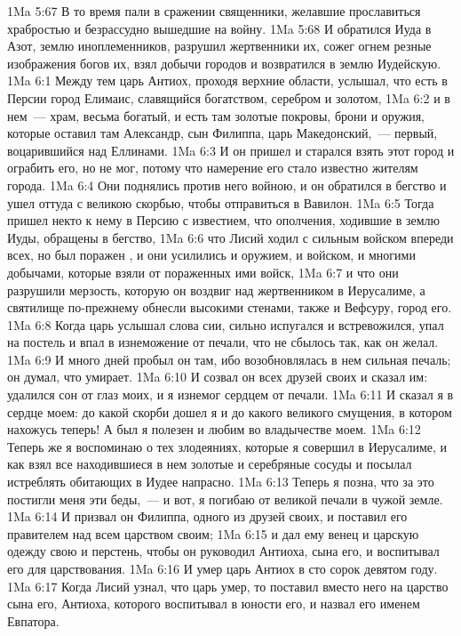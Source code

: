 \vs 1Ma 5:67 В то время пали в сражении священники, желавшие прославиться храбростью и безрассудно вышедшие на войну.
\vs 1Ma 5:68 И обратился Иуда в Азот, землю иноплеменников, разрушил жертвенники их, сожег огнем резные изображения богов их, взял добычи городов и возвратился в землю Иудейскую.
\vs 1Ma 6:1 Между тем царь Антиох, проходя верхние области, услышал, что есть в Персии город Елимаис, славящийся богатством, серебром и золотом,
\vs 1Ma 6:2 и в нем~--- храм, весьма богатый, и есть там золотые покровы, брони и оружия, которые оставил там Александр, сын Филиппа, царь Македонский,~--- первый, воцарившийся над Еллинами.
\vs 1Ma 6:3 И он пришел и старался взять этот город и ограбить его, но не мог, потому что намерение его стало известно жителям города.
\vs 1Ma 6:4 Они поднялись против него войною, и он обратился в бегство и ушел оттуда с великою скорбью, чтобы отправиться в Вавилон.
\vs 1Ma 6:5 Тогда пришел некто к нему в Персию с известием, что ополчения, ходившие в землю Иуды, обращены в бегство,
\vs 1Ma 6:6 что Лисий ходил с сильным войском впереди всех, но был поражен , и они усилились и оружием, и войском, и многими добычами, которые взяли от пораженных ими войск,
\vs 1Ma 6:7 и что они разрушили мерзость, которую он воздвиг над жертвенником в Иерусалиме, а святилище по-прежнему обнесли высокими стенами, также и Вефсуру, город его.
\vs 1Ma 6:8 Когда царь услышал слова сии, сильно испугался и встревожился, упал на постель и впал в изнеможение от печали, что не сбылось так, как он желал.
\vs 1Ma 6:9 И много дней пробыл он там, ибо возобновлялась в нем сильная печаль; он думал, что умирает.
\vs 1Ma 6:10 И созвал он всех друзей своих и сказал им: удалился сон от глаз моих, и я изнемог сердцем от печали.
\vs 1Ma 6:11 И сказал я в сердце моем: до какой скорби дошел я и до какого великого смущения, в котором нахожусь теперь! А был я полезен и любим во владычестве моем.
\vs 1Ma 6:12 Теперь же я воспоминаю о тех злодеяниях, которые я совершил в Иерусалиме, и как взял все находившиеся в нем золотые и серебряные сосуды и посылал истреблять обитающих в Иудее напрасно.
\vs 1Ma 6:13 Теперь я позна, что за это постигли меня эти беды,~--- и вот, я погибаю от великой печали в чужой земле.
\vs 1Ma 6:14 И призвал он Филиппа, одного из друзей своих, и поставил его правителем над всем царством своим;
\vs 1Ma 6:15 и дал ему венец и царскую одежду свою и перстень, чтобы он руководил Антиоха, сына его, и воспитывал его для царствования.
\vs 1Ma 6:16 И умер царь Антиох в сто сорок девятом году.
\rsbpar\vs 1Ma 6:17 Когда Лисий узнал, что царь умер, то поставил вместо него на царство сына его, Антиоха, которого воспитывал в юности его, и назвал его именем Евпатора.
